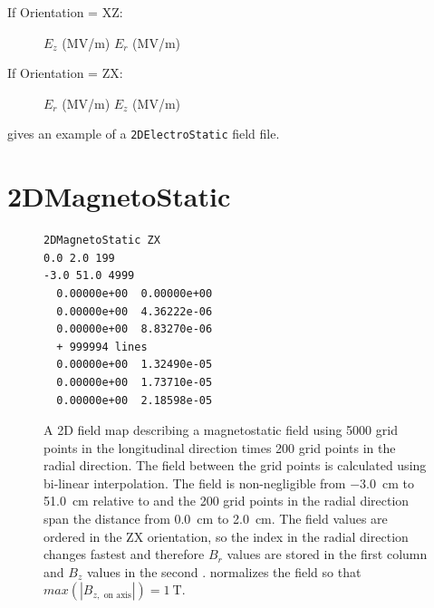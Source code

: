 \begin{description}
\item[If Orientation = XZ:] $E_{z}$ (MV/m) $E_{r}$ (MV/m)
\item[If Orientation = ZX:] $E_{r}$ (MV/m) $E_{z}$ (MV/m)
\end{description}

 gives an example of a \texttt{2DElectroStatic} field file.

\clearpage

\section{2DMagnetoStatic}
\label{sec:2DMagnetoStatic}
\begin{figure}[h]
  \begin{fmpage}
\begin{verbatim}
2DMagnetoStatic ZX
0.0 2.0 199
-3.0 51.0 4999
  0.00000e+00  0.00000e+00
  0.00000e+00  4.36222e-06
  0.00000e+00  8.83270e-06
  + 999994 lines
  0.00000e+00  1.32490e-05
  0.00000e+00  1.73710e-05
  0.00000e+00  2.18598e-05
\end{verbatim}
  \end{fmpage}
  \caption[Example of a 2DMagnetoStatic field map]{A 2D field map describing a magnetostatic field using 5000 grid points
    in the longitudinal direction times 200 grid points in the radial direction. The field between the grid points is calculated
    using bi-linear interpolation. The field is non-negligible from \SI{-3.0}{\centi\meter} to \SI{51.0}{\centi\meter} relative to  and the 200 grid
    points in the radial direction span the distance from \SI{0.0}{\centi\meter} to \SI{2.0}{\centi\meter}. The field values are ordered in the ZX
    orientation, so the index in the radial direction changes fastest and therefore $B_r$ values are stored in the first column
    and $B_z$ values in the second . \opalt normalizes the field so that $max(|B_{z,\text{ on axis}}|) = \SI{1}{\tesla}$.}
  \label{fig:2DMagnetoStatic}
\end{figure}


